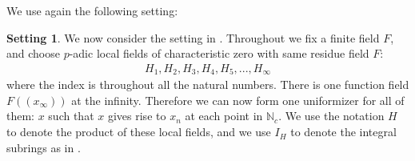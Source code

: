 \documentclass[12pt]{article}
\theoremstyle{definition}
\newtheorem{setting}{Setting}
\begin{document}
We use again the following setting:

\begin{setting}
We now consider the setting in \cite{5LH}. Throughout we fix a finite field $F$, and choose $p$-adic local fields of characteristic zero with same residue field $F$:
\begin{align}
H_1,H_2,H_3,H_4,H_5,...,H_\infty
\end{align}
where the index is throughout all the natural numbers. There is one function field $F((x_\infty))$ at the infinity. Therefore we can now form one uniformizer for all of them: $x$ such that $x$ gives rise to $x_n$ at each point in $\mathbb{N}_c$. We use the notation $H$ to denote the product of these local fields, and we use $I_H$ to denote the integral subrings as in \cite{5LH}.
\end{setting}
\end{document}
